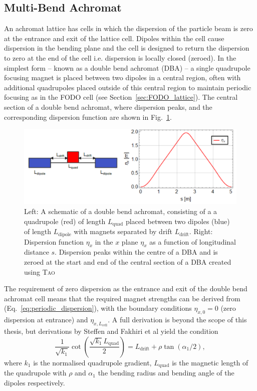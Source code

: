 \documentclass[../main.tex]{subfiles}
\begin{document}
\subsection{Multi-Bend Achromat}

An achromat lattice has cells in which the dispersion of the particle beam is zero at the entrance and exit of the lattice cell. Dipoles within the cell cause dispersion in the bending plane and the cell is designed to return the dispersion to zero at the end of the cell i.e. dispersion is locally closed (zeroed).  In the simplest form -- known as a double bend achromat (DBA) -- a single quadrupole focusing magnet is placed between two dipoles in a central region, often with additional quadrupoles placed outside of this central region to maintain periodic focusing as in the FODO cell (see Section~\ref{sec:FODO_lattice}). The central section of a double bend achromat, where dispersion peaks, and the corresponding dispersion function are shown in Fig.~\ref{fig:DBA_diagram}.
\begin{figure}[!h]
\centering
\includegraphics[width=\textwidth]{Figures/Energy_Recovery_Linac_Design/DBA_diagram.pdf}
\caption{Left: A schematic of a double bend achromat, consisting of a a quadrupole (red) of length $L_{\mathrm{quad}}$ placed between two dipoles (blue) of length $L_{\mathrm{dipole}}$ with magnets separated by drift $L_{\mathrm{drift}}$. Right: Dispersion function $\eta_{x}$ in the $x$ plane $\eta_{x}$ as a function of longitudinal distance $s$. Dispersion peaks within the centre of a DBA and is zeroed at the start and end of the central section of a DBA created using \textsc{Tao} \cite{TaoManual}}
\label{fig:DBA_diagram}
\end{figure}

The requirement of zero dispersion as the entrance and exit of the double bend achromat cell means that the required magnet strengths can be derived from (Eq.~\ref{eq:periodic_dispersion}), with the boundary conditions $\eta_{x,0}=0$ (zero dispersion at entrance) and $\eta_{x,L_{\mathrm{cell}}}$. A full derivation is beyond the scope of this thesis, but derivations by Steffen \cite{steffen1983periodic} and Fakhiri et al \cite{fakhri2015analytical} yield the condition
\begin{equation}
\frac{1}{\sqrt{k_{1}}}\cot\left(\frac{\sqrt{k_{1}}L_{\mathrm{quad}}}{2}\right) = L_{\mathrm{drift}} + \rho\tan\left(\alpha_{1}/2\right),
\label{eq:DBA_magnets}
\end{equation}
where $k_{1}$ is the normalised quadrupole gradient, $L_{\mathrm{quad}}$ is the magnetic length of the quadrupole with $\rho$ and $\alpha_{1}$ the bending radius and bending angle of the dipoles respectively. 
\end{document}
